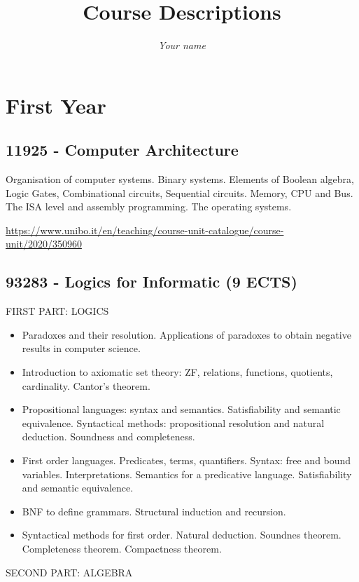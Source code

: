 \documentclass{article}
\title{Course Descriptions}
\author{\textit{Your name}}
\begin{document}
\maketitle

\section{First Year}

\subsection{11925 - Computer Architecture}

Organisation of computer systems. Binary systems. Elements of Boolean algebra, Logic Gates, Combinational circuits, Sequential circuits. Memory, CPU and Bus. The ISA level and assembly programming. The operating systems.


\url{https://www.unibo.it/en/teaching/course-unit-catalogue/course-unit/2020/350960}

\subsection{93283 - Logics for Informatic (9 ECTS)}

FIRST PART: LOGICS

\begin{itemize}
    \item Paradoxes and their resolution. Applications of paradoxes to obtain negative results in computer science.
    \item Introduction to axiomatic set theory: ZF, relations, functions, quotients, cardinality. Cantor's theorem.
    \item Propositional languages: syntax and semantics. Satisfiability and semantic equivalence. Syntactical methods: propositional resolution and natural deduction. Soundness and completeness.
    \item First order languages. Predicates, terms, quantifiers. Syntax: free and bound variables. Interpretations. Semantics for a predicative language. Satisfiability and semantic equivalence.
    \item BNF to define grammars. Structural induction and recursion.
    \item Syntactical methods for first order. Natural deduction. Soundnes theorem. Completeness theorem. Compactness theorem.
\end{itemize}

SECOND PART: ALGEBRA
\end{document}
